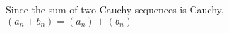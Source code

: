 \documentclass[preview]{standalone}
\begin{document}
\begin{center}
Since the sum of two Cauchy sequences is Cauchy,\\$(a_n + b_n) = (a_n) + (b_n)$
\end{center}
\end{document}
